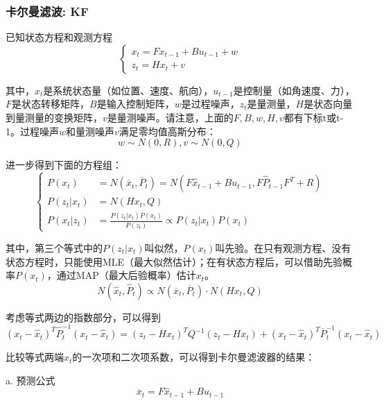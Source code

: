 \documentclass{ctexart}
\begin{document}
	\subsubsection*{卡尔曼滤波: KF}
	已知状态方程和观测方程
	\begin{equation}
	\left\{
	\begin{array}{lr}
	x_t = F x_{t-1} + B u_{t-1} + w \\
	z_t = H x_t + v
	\end{array}
	\right.
	\end{equation}
	\par 其中，$x_t$是系统状态量（如位置、速度、航向），$u_{t-1}$是控制量（如角速度、力），$F$是状态转移矩阵，$B$是输入控制矩阵，$w$是过程噪声，$z_t$是量测量，$H$是状态向量到量测量的变换矩阵，$v$是量测噪声。请注意，上面的$F,B,w,H,v$都有下标t或t-1。过程噪声$w$和量测噪声$v$满足零均值高斯分布：
	\begin{equation}
	w \sim N(0,R),v \sim N(0,Q)
	\end{equation}
	\par 进一步得到下面的方程组：
	\begin{equation}
	\left\{
	\begin{split}
	P(x_t)
	&=N(\overline{x}_t,\overline{P}_t)
	=N(F \hat{x}_{t-1} + B u_{t-1}, F \hat{P}_{t-1} F^T + R) \\
	P(z_t|x_t) &=N(H x_t,Q) \\
	P(x_t|z_t) &= \frac{P(z_t|x_t) P(x_t)}{P(z_t)} \propto P(z_t|x_t) P(x_t)
	\end{split}
	\right.
	\end{equation}
	\par 其中，第三个等式中的$P(z_t|x_t)$叫似然，$P(x_t)$叫先验。在只有观测方程、没有状态方程时，只能使用MLE（最大似然估计）；在有状态方程后，可以借助先验概率$P(x_t)$，通过MAP（最大后验概率）估计$x_t$。
	\begin{equation}
	N(\hat{x}_t,\hat{P}_t) \propto N(\overline{x}_t,\overline{P}_t) \cdot N(H x_t,Q)
	\end{equation}
	\par 考虑等式两边的指数部分，可以得到
	\begin{equation}
	(x_t-\hat{x}_t)^T\hat{P}_t^{-1}(x_t-\hat{x}_t)
	=
	(z_t-H x_t)^T Q^{-1} (z_t-H x_t)
	+
	(x_t-\hat{x}_t)^T \overline{P}_t^{-1} (x_t-\hat{x}_t)
	\end{equation}
	\par 比较等式两端$x_t$的一次项和二次项系数，可以得到卡尔曼滤波器的结果：
	\par {a. 预测公式}
	\begin{equation}
	\overline{x}_t=F\hat{x}_{t-1} + B u_{t-1}
	\end{equation}
\end{document}

